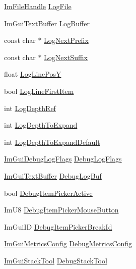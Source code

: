 \begin{DoxyCompactItemize}
\item 
\hyperlink{imgui__internal_8h_a5c58fe70d0547f85609b2b99ab451efe}{Im\+File\+Handle} \hyperlink{structImGuiContext_af533c63d15c334b863f9e95f11aca78a}{Log\+File}
\item 
\hyperlink{structImGuiTextBuffer}{Im\+Gui\+Text\+Buffer} \hyperlink{structImGuiContext_a7ee6cc4eb7d913073f7f65245f74b44b}{Log\+Buffer}
\item 
const char $\ast$ \hyperlink{structImGuiContext_a48d9613d2debdc972cf22f98c241faa9}{Log\+Next\+Prefix}
\item 
const char $\ast$ \hyperlink{structImGuiContext_a877334cd40755e94cad5549f30774767}{Log\+Next\+Suffix}
\item 
float \hyperlink{structImGuiContext_a8da8ba7ae9201ae085630a396d226244}{Log\+Line\+PosY}
\item 
bool \hyperlink{structImGuiContext_ab011a2f260e200403d6177bdccc3b20b}{Log\+Line\+First\+Item}
\item 
int \hyperlink{structImGuiContext_a56710f298126b4a30a9d45c433ec66be}{Log\+Depth\+Ref}
\item 
int \hyperlink{structImGuiContext_a03a52c2f6ed034934140180049e1ad93}{Log\+Depth\+To\+Expand}
\item 
int \hyperlink{structImGuiContext_a48b837ab4012447dde42bab75406abdd}{Log\+Depth\+To\+Expand\+Default}
\item 
\hyperlink{imgui__internal_8h_abfc6be9b71a71c8bb18e502a6d577b66}{Im\+Gui\+Debug\+Log\+Flags} \hyperlink{structImGuiContext_a418d69aff01c536fc3af893b517eaf78}{Debug\+Log\+Flags}
\item 
\hyperlink{structImGuiTextBuffer}{Im\+Gui\+Text\+Buffer} \hyperlink{structImGuiContext_a2ccb382cc1097db9c226126fb0726a6d}{Debug\+Log\+Buf}
\item 
bool \hyperlink{structImGuiContext_a166e3b48f51fc46f01145dbaf695ef4f}{Debug\+Item\+Picker\+Active}
\item 
Im\+U8 \hyperlink{structImGuiContext_a2b48e945853da5587a0f6feb8525923d}{Debug\+Item\+Picker\+Mouse\+Button}
\item 
Im\+Gui\+ID \hyperlink{structImGuiContext_a87f10f1e5b4c2a3550cf9bc1ca57bac5}{Debug\+Item\+Picker\+Break\+Id}
\item 
\hyperlink{structImGuiMetricsConfig}{Im\+Gui\+Metrics\+Config} \hyperlink{structImGuiContext_a31e8817483f05c9b790788636190ee47}{Debug\+Metrics\+Config}
\item 
\hyperlink{structImGuiStackTool}{Im\+Gui\+Stack\+Tool} \hyperlink{structImGuiContext_a4b26a74f8ba51543730fb526c2c2c663}{Debug\+Stack\+Tool}

\end{DoxyCompactItemize}
